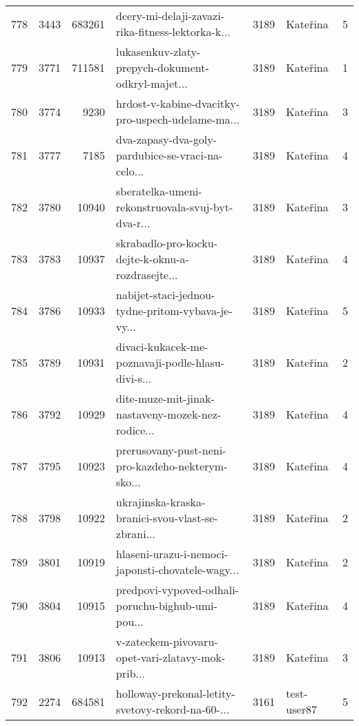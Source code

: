 \begin{tabular}{lrrlrlr}
778  &       3443 &   683261 &  dcery-mi-delaji-zavazi-rika-fitness-lektorka-k... &     3189 &                     Kateřina &               5 \\
779  &       3771 &   711581 &  lukasenkuv-zlaty-prepych-dokument-odkryl-majet... &     3189 &                     Kateřina &               1 \\
780  &       3774 &     9230 &  hrdost-v-kabine-dvacitky-pro-uspech-udelame-ma... &     3189 &                     Kateřina &               3 \\
781  &       3777 &     7185 &  dva-zapasy-dva-goly-pardubice-se-vraci-na-celo... &     3189 &                     Kateřina &               4 \\
782  &       3780 &    10940 &  sberatelka-umeni-rekonstruovala-svuj-byt-dva-r... &     3189 &                     Kateřina &               3 \\
783  &       3783 &    10937 &  skrabadlo-pro-kocku-dejte-k-oknu-a-rozdrasejte... &     3189 &                     Kateřina &               4 \\
784  &       3786 &    10933 &  nabijet-staci-jednou-tydne-pritom-vybava-je-vy... &     3189 &                     Kateřina &               5 \\
785  &       3789 &    10931 &  divaci-kukacek-me-poznavaji-podle-hlasu-divi-s... &     3189 &                     Kateřina &               2 \\
786  &       3792 &    10929 &  dite-muze-mit-jinak-nastaveny-mozek-nez-rodice... &     3189 &                     Kateřina &               4 \\
787  &       3795 &    10923 &  prerusovany-pust-neni-pro-kazdeho-nekterym-sko... &     3189 &                     Kateřina &               4 \\
788  &       3798 &    10922 &  ukrajinska-kraska-branici-svou-vlast-se-zbrani... &     3189 &                     Kateřina &               2 \\
789  &       3801 &    10919 &  hlaseni-urazu-i-nemoci-japonsti-chovatele-wagy... &     3189 &                     Kateřina &               2 \\
790  &       3804 &    10915 &  predpovi-vypoved-odhali-poruchu-bighub-umi-pou... &     3189 &                     Kateřina &               4 \\
791  &       3806 &    10913 &  v-zateckem-pivovaru-opet-vari-zlatavy-mok-prib... &     3189 &                     Kateřina &               3 \\
792  &       2274 &   684581 &  holloway-prekonal-letity-svetovy-rekord-na-60-... &     3161 &                  test-user87 &               5 \\

\end{tabular}
